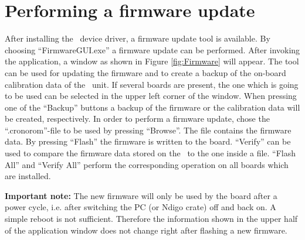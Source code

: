 \section{Performing a firmware update}

After installing the \deviceName\ device driver, a firmware update tool is available.
 By choosing ``FirmwareGUI.exe'' a firmware update can be performed. 
 After invoking the application, a window as shown in Figure \ref{fig:Firmware} will appear. 
 The tool can be used for updating the firmware and to create a backup of the on-board calibration data of the \deviceName\ unit. 
 If several boards are present, the one which is going to be used can be selected in the upper left corner of the window. 
 When pressing one of the ``Backup'' buttons a backup of the firmware or the calibration data will be created, respectively. 
 In order to perform a firmware update, chose the ``.cronorom''-file to be used by pressing ``Browse''. 
 The file contains the firmware data. By pressing ``Flash'' the firmware is written to the board. 
 ``Verify'' can be used to compare the firmware data stored on the \deviceName\ to the one inside a file.
 ``Flash All'' and ``Verify All'' perform the corresponding operation on all boards which are installed.\par

\begin{figure*}[ht]
    \begin{center}
        \caption{\label{fig:Firmware}The firmware update and calibration data backup tool as provided with the \deviceName\ device driver.}
    \end{center}
\end{figure*}

\textbf{Important note:} The new firmware will only be used by the board after a power cycle, i.e. after switching the PC (or Ndigo crate) off and back on. 
A simple reboot is not sufficient. Therefore the information shown in the upper half of the application window does not change right after flashing a new firmware.

